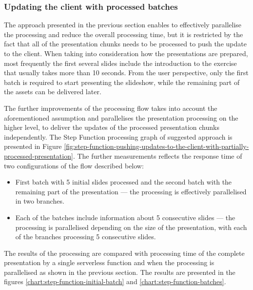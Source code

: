 \subsubsection{Updating the client with processed batches} \label{section:case-study-updating-the-client-with-processed-batch}

The approach presented in the previous section enables to effectively parallelise the processing and reduce the overall processing time, but it is restricted by the fact that all of the presentation chunks needs to be processed to push the update to the client. When taking into consideration how the presentations are prepared, most frequently the first several slides include the introduction to the exercise that usually takes more than 10 seconds. From the user perspective, only the first batch is required to start presenting the slideshow, while the remaining part of the assets can be delivered later.

The further improvements of the processing flow takes into account the aforementioned assumption and parallelises the presentation processing on the higher level, to deliver the updates of the processed presentation chunks independently. The Step Function processing graph of suggested approach is presented in Figure \ref{fig:step-function-pushing-updates-to-the-client-with-partially-processed-presentation}. The further measurements reflects the response time of two configurations of the flow described below:

\begin{itemize}
   \item First batch with 5 initial slides processed and the second batch with the remaining part of the presentation --- the processing is effectively parallelised in two branches.
   \item Each of the batches include information about 5 consecutive slides --- the processing is parallelised depending on the size of the presentation, with each of the branches processing 5 consecutive slides.
\end{itemize}

The results of the processing are compared with processing time of the complete presentation by a single serverless function and when the processing is parallelised as shown in the previous section. The results are presented in the figures \ref{chart:step-function-initial-batch} and \ref{chart:step-function-batches}.

